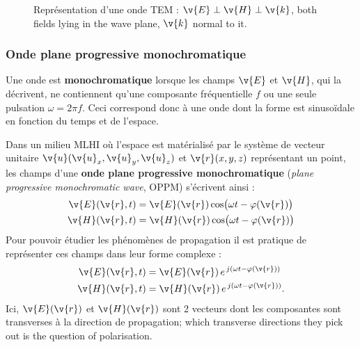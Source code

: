 \begin{figure}[h!]
  \centering
  \caption*{\small Représentation d'une onde TEM : $\v{E} \perp \v{H} \perp
  \v{k}$, both fields lying in the wave plane, $\v{k}$ normal to it.}
\end{figure}

\subsubsection{Onde plane progressive monochromatique}

\begin{definition}
  Une onde est \textbf{monochromatique} lorsque les champs $\v{E}$ et $\v{H}$,
  qui la décrivent, ne contiennent qu'une composante fréquentielle $f$ ou une
  seule pulsation $\omega = 2\pi f$. Ceci correspond donc à une onde dont la
  forme est sinusoïdale en fonction du temps et de l'espace.
\end{definition}

Dans un milieu MLHI où l'espace est matérialisé par le système de vecteur
unitaire $\v{u}(\v{u}_x,\v{u}_y,\v{u}_z)$ et $\v{r}(x,y,z)$ représentant un
point, les champs d'une \textbf{onde plane progressive monochromatique}
(\textit{plane progressive monochromatic wave}, OPPM) s'écrivent ainsi :
\[
  \begin{aligned}
    \v{E}(\v{r},t) &= \v{E}(\v{r})\cos\!\big(\omega t - \varphi(\v{r})\big) \\
    \v{H}(\v{r},t) &= \v{H}(\v{r})\cos\!\big(\omega t - \varphi(\v{r})\big)
  \end{aligned}
\]
Pour pouvoir étudier les phénomènes de propagation il est pratique de
représenter ces champs dans leur forme complexe :
\[
  \begin{aligned}
    \v{E}(\v{r},t) &= \v{E}(\v{r})\,e^{\,j(\omega t - \varphi(\v{r}))} \\
    \v{H}(\v{r},t) &= \v{H}(\v{r})\,e^{\,j(\omega t - \varphi(\v{r}))}.
  \end{aligned}
\]
Ici, $\v{E}(\v{r})$ et $\v{H}(\v{r})$ sont 2 vecteurs dont les composantes sont
transverses à la direction de propagation; which transverse directions they
pick out is the question of polarisation.\\

